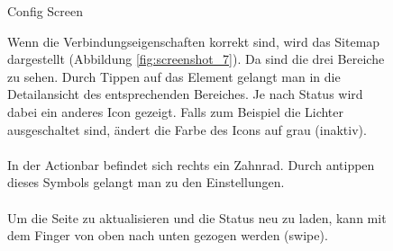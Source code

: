 \begin{figure}[htbp]
\begin{minipage}{0.32\textwidth}
		\caption{Config Screen}
		\label{fig:screenshot_2}
	\end{minipage}
\end{figure}


\begin{figure}[htbp]
	\begin{minipage}{0.6\textwidth} 
Wenn die Verbindungseigenschaften korrekt sind, wird das Sitemap dargestellt (Abbildung \ref{fig:screenshot_7}). Da sind die drei Bereiche zu sehen. Durch Tippen auf das Element gelangt man in die Detailansicht des entsprechenden Bereiches. Je nach Status wird dabei ein anderes Icon gezeigt. Falls zum Beispiel die Lichter ausgeschaltet sind, ändert die Farbe des Icons auf grau (inaktiv). \\ \\
In der Actionbar befindet sich rechts ein Zahnrad. Durch antippen dieses Symbols gelangt man zu den Einstellungen.
\\ \\
Um die Seite zu aktualisieren und die Status neu zu laden, kann mit dem Finger von oben nach unten gezogen werden (swipe).
	\end{minipage}
	\hfill
	\begin{minipage}{0.32\textwidth}

\end{minipage}
\end{figure}
